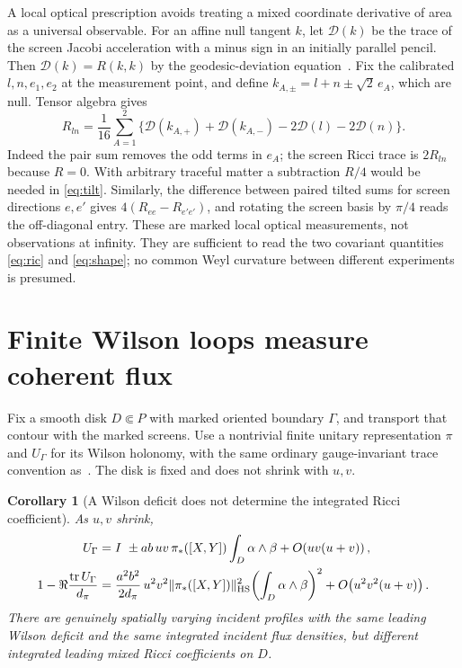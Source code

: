 \documentclass[11pt]{article}
\newtheorem{corollary}[theorem]{Corollary}
\newcommand{\tr}{\operatorname{tr}}
\newcommand{\cD}{\mathcal D}
\begin{document}
A local optical prescription avoids treating a mixed coordinate derivative of area as a universal observable. For an affine null tangent \(k\), let \(\cD(k)\) be the trace of the screen Jacobi acceleration with a minus sign in an initially parallel pencil. Then \(\cD(k)=R(k,k)\) by the geodesic-deviation equation~\cite{Sachs}. Fix the calibrated \(l,n,e_1,e_2\) at the measurement point, and define \(k_{A,\pm}=l+n\pm\sqrt2\,e_A\), which are null. Tensor algebra gives
\begin{equation}
 R_{ln}=\frac1{16}\sum_{A=1}^2
       \{\cD(k_{A,+})+\cD(k_{A,-})-2\cD(l)-2\cD(n)\}.
 \label{eq:tilt}
\end{equation}
Indeed the pair sum removes the odd terms in \(e_A\); the screen Ricci trace is \(2R_{ln}\) because \(R=0\). With arbitrary traceful matter a subtraction \(R/4\) would be needed in \eqref{eq:tilt}. Similarly, the difference between paired tilted sums for screen directions \(e,e'\) gives \(4(R_{ee}-R_{e'e'})\), and rotating the screen basis by \(\pi/4\) reads the off-diagonal entry. These are marked local optical measurements, not observations at infinity. They are sufficient to read the two covariant quantities \eqref{eq:ric} and \eqref{eq:shape}; no common Weyl curvature between different experiments is presumed.

\section{Finite Wilson loops measure coherent flux}

Fix a smooth disk \(D\Subset P\) with marked oriented boundary \(\Gamma\), and transport that contour with the marked screens. Use a nontrivial finite unitary representation \(\pi\) and \(U_\Gamma\) for its Wilson holonomy, with the same ordinary gauge-invariant trace convention as~\cite{Wilson}. The disk is fixed and does not shrink with \(u,v\).

\begin{corollary}[A Wilson deficit does not determine the integrated Ricci coefficient]\label{cor:wilson}
As \(u,v\) shrink,
\begin{align}
 U_\Gamma&=I\ \pm ab\,uv\,\pi_*([X,Y])
       \int_D\alpha\wedge\beta + O\!\left(uv(u+v)\right), \label{eq:hol}\\
 1-\Re\frac{\tr U_\Gamma}{d_\pi}
   &=\frac{a^2b^2}{2d_\pi}\,u^2v^2
       \|\pi_*([X,Y])\|_{\rm HS}^2\!
       \left(\int_D\alpha\wedge\beta\right)^2
       +O\!\left(u^2v^2(u+v)\right).
 \label{eq:deficit}
\end{align}
There are genuinely spatially varying incident profiles with the same leading Wilson deficit and the same integrated incident flux densities, but different integrated leading mixed Ricci coefficients on \(D\).
\end{corollary}
\end{document}
